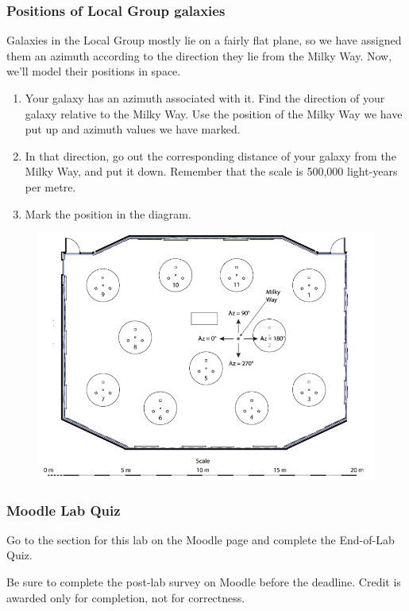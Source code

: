 \documentclass[main.tex]{subfiles}
\begin{document}
\subsubsection{Positions of Local Group galaxies}
Galaxies in the Local Group mostly lie on a fairly flat plane, so we have assigned them an azimuth according to the direction they lie from the Milky Way. Now, we'll model their positions in space.
\begin{enumerate}
\item Your galaxy has an azimuth associated with it. Find the direction of your galaxy relative to the Milky Way. Use the position of the Milky Way we have put up and azimuth values we have marked.
\item In that direction, go out the corresponding distance of your galaxy from the Milky Way, and put it down. Remember that the scale is 500,000 light-years per metre.
\item Mark the position in the diagram.
\end{enumerate}
\begin{figure}
\begin{center}
\includegraphics[width=\textwidth]{galclass.png}
\label{fig:galclass}
\end{center}
\end{figure}
\vspace{-20pt}
 
\subsubsection{Moodle Lab Quiz}
Go to the section for this lab on the Moodle page and complete the End-of-Lab Quiz.

Be sure to complete the post-lab survey on Moodle before the deadline. Credit is awarded only for completion, not for correctness.
\end{document}
